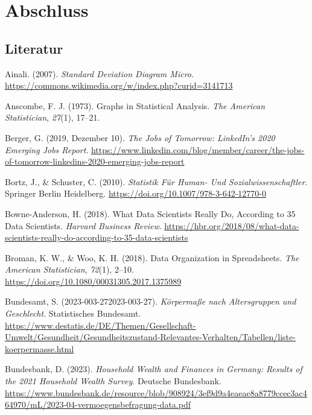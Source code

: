 \documentclass[
  letterpaper,
]{scrbook}
\newlength{\cslhangindent}
\newenvironment{CSLReferences}[2] %
 {\begin{list}{}{%
  \setlength{\itemindent}{0pt}
  \setlength{\leftmargin}{0pt}
  \setlength{\parsep}{0pt}
  \ifodd #1
   \setlength{\leftmargin}{\cslhangindent}
   \setlength{\itemindent}{-1\cslhangindent}
  \fi
  \setlength{\itemsep}{#2\baselineskip}}}
 {\end{list}}
\theoremstyle{definition}
\theoremstyle{definition}
\theoremstyle{definition}
\theoremstyle{remark}
\begin{document}
\part{Abschluss}

\chapter*{Literatur}\label{literatur}


\label{refs}
\begin{CSLReferences}{1}{0}
Ainali. (2007). \emph{Standard Deviation Diagram Micro}.
\url{https://commons.wikimedia.org/w/index.php?curid=3141713}

Anscombe, F. J. (1973). Graphs in Statistical Analysis. \emph{The
American Statistician}, \emph{27}(1), 17--21.

Berger, G. (2019, Dezember 10). \emph{The {Jobs} of {Tomorrow}:
{LinkedIn}'s 2020 {Emerging Jobs Report}}.
\url{https://www.linkedin.com/blog/member/career/the-jobs-of-tomorrow-linkedins-2020-emerging-jobs-report}

Bortz, J., \& Schuster, C. (2010). \emph{Statistik Für {Human-} Und
{Sozialwissenschaftler}}. Springer Berlin Heidelberg.
\url{https://doi.org/10.1007/978-3-642-12770-0}

Bowne-Anderson, H. (2018). What {Data Scientists Really Do}, {According}
to 35 {Data Scientists}. \emph{Harvard Business Review}.
\url{https://hbr.org/2018/08/what-data-scientists-really-do-according-to-35-data-scientists}

Broman, K. W., \& Woo, K. H. (2018). Data {Organization} in
{Spreadsheets}. \emph{The American Statistician}, \emph{72}(1), 2--10.
\url{https://doi.org/10.1080/00031305.2017.1375989}

Bundesamt, S. (2023-003-272023-003-27). \emph{Körpermaße nach
Altersgruppen und Geschlecht}. Statistisches Bundesamt.
\url{https://www.destatis.de/DE/Themen/Gesellschaft-Umwelt/Gesundheit/Gesundheitszustand-Relevantes-Verhalten/Tabellen/liste-koerpermasse.html}

Bundesbank, D. (2023). \emph{Household Wealth and Finances in {Germany}:
{Results} of the 2021 Household Wealth Survey}. Deutsche Bundesbank.
\url{https://www.bundesbank.de/resource/blob/908924/3ef9d9a4eaeae8a8779ccec3ac464970/mL/2023-04-vermoegensbefragung-data.pdf}


\end{CSLReferences}
\end{document}
